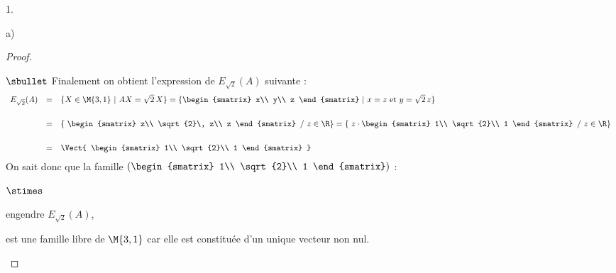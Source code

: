 \documentclass[11pt]{article}%
\begin{document}
\begin{noliste}{1.}
\begin{noliste}{a)}
\begin{proof}
\begin{noliste}{$\sbullet$}
	Finalement on obtient l'expression de $E_{\sqrt{2}}(A)$ 
	suivante :
	\[
	 \begin{array}{rcl}
	  E_{\sqrt{2}}(A) & = & \{X\in\M{3,1} \ | \ AX=\sqrt{2}\, X\}
	   = \{
	  \begin{smatrix}
	   x\\ y\\ z
	  \end{smatrix}
	  \ | \
	   x = z \mbox{ et }
	   y = \sqrt{2} \, z
	  \}
	  \\[.6cm]
	  & = & \left\{\right.
	  \begin{smatrix}
	   z\\ 
	   \sqrt{2}\, z\\ 
	   z
	  \end{smatrix}
	  \ \left/ \
	  z\in\R\right\}
	   = \left\{\right. z \cdot
	  \begin{smatrix}
	   1\\ 
	   \sqrt{2}\\ 
	   1
	  \end{smatrix}
	  \ \left/ \
	  z\in\R\right\}
	  \\[.6cm]
	  & = & \Vect{
	  \begin{smatrix}
	   1\\ \sqrt{2}\\ 1
	  \end{smatrix}
	  }
	 \end{array}
	\]
	On sait donc que la famille $\left( \begin{smatrix}
	   1\\ \sqrt{2}\\ 1
	  \end{smatrix}\right)$ :
	\begin{noliste}{$\stimes$}
	  \item engendre $E_{\sqrt{2}}(A)$,
	  \item est une famille libre de $\M{3,1}$ car elle est 
	  constituée d'un unique vecteur non nul.
	\end{noliste}
	
	  

\end{noliste}
\end{proof}
\end{noliste}
\end{noliste}
\end{document}

